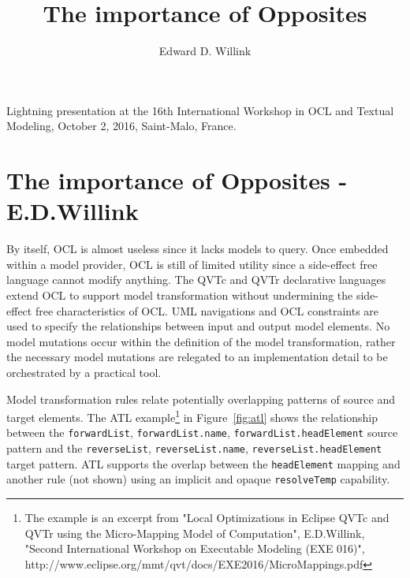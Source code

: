 \documentclass{llncs}
\begin{document}
%
\mainmatter              %
%
\title{The importance of Opposites}
%
%
\author{Edward D. Willink}
%
%
%


\maketitle              %
Lightning presentation at the 16th International Workshop in OCL and Textual Modeling, October 2, 2016, Saint-Malo, France.
%
\pagebreak
%
\section{The importance of Opposites - E.D.Willink}
By itself, OCL is almost useless since it lacks models to query. Once embedded within a model provider, OCL is still of limited utility since a side-effect free language cannot modify anything. The QVTc and QVTr declarative languages extend OCL to support model transformation without undermining the side-effect free characteristics of OCL. UML navigations and OCL constraints are used to specify the relationships between input and output model elements. No model mutations occur within the definition of the model transformation, rather the necessary model mutations are relegated to an implementation detail to be orchestrated by a practical tool.

Model transformation rules relate potentially overlapping patterns of source and target elements. The ATL example\footnote{The example is an excerpt from "Local Optimizations in Eclipse QVTc and QVTr using the Micro-Mapping Model of Computation", E.D.Willink, "Second International Workshop on Executable Modeling (EXE 016)", http://www.eclipse.org/mmt/qvt/docs/EXE2016/MicroMappings.pdf} in Figure~\ref{fig:atl} shows the relationship between the \texttt{forwardList}, \texttt{forwardList.name}, \texttt{forwardList.headElement} source pattern and the \texttt{reverseList}, \texttt{reverseList.name}, \texttt{reverseList.headElement} target pattern. ATL supports the overlap between the \texttt{headElement} mapping and another rule (not  shown) using an implicit and opaque \texttt{resolveTemp} capability. 
\end{document}
